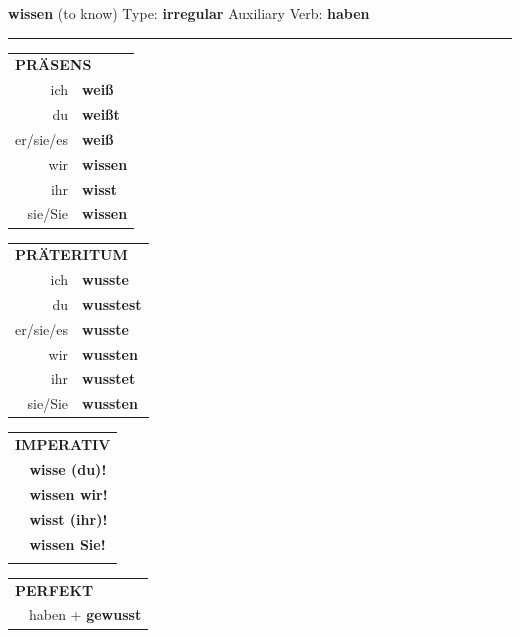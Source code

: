 \documentclass[10pt,a4paper]{revtex4-2}
\begin{document}
\begin{verbbox}
    {\Large \bf wissen} (to know) \hfill Type: \textbf{irregular} \hfill Auxiliary Verb: \textbf{haben} 
    
     \vspace{5pt}

    \hrule
    
    \vspace{5pt}

  \begin{tabular}{rl}
     \multicolumn{2}{l}{\textbf{PRÄSENS} }\\
    ich & \textbf{weiß}\\
    du & \textbf{weißt}\\
    er/sie/es & \textbf{weiß}\\
    wir & \textbf{wissen}\\
    ihr & \textbf{wisst}\\
    sie/Sie & \textbf{wissen}\\
  \end{tabular}
  \hfill
     \begin{tabular}{rl}
    \multicolumn{2}{l}{\textbf{PRÄTERITUM} }\\
    ich & \textbf{wusste}\\
    du & \textbf{wusstest}\\
    er/sie/es & \textbf{wusste}\\
    wir & \textbf{wussten}\\
    ihr & \textbf{wusstet}\\
    sie/Sie & \textbf{wussten}\\
  \end{tabular}
  \hfill
  \begin{tabular}{rl}
     \multicolumn{2}{l}{\textbf{IMPERATIV} }\\
   & \textbf{wisse (du)!}\\
   & \textbf{wissen wir!}\\
   & \textbf{wisst (ihr)!}\\
   & \textbf{wissen Sie!}\\
   & \vspace{10pt}
  \end{tabular}

    \vspace{10pt}

 \begin{tabular}{rl}
     \multicolumn{2}{l}{\textbf{PERFEKT}}\\
  &  haben + \textbf{gewusst}\\
  \end{tabular}
\hfill
   \begin{tabular}{rl}
   

\end{tabular}
\end{verbbox}
\end{document}
